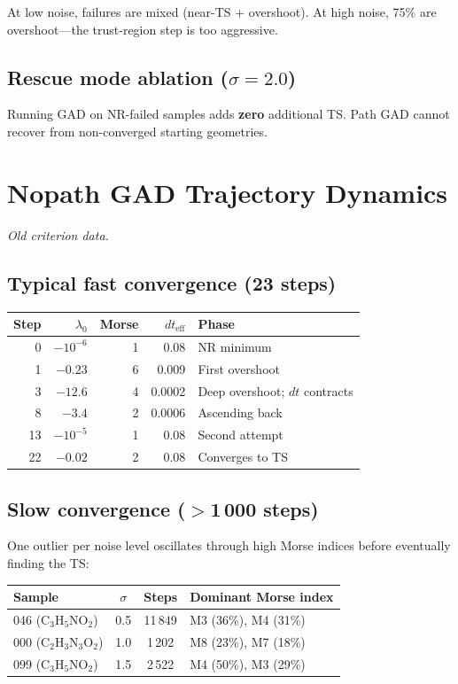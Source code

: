 \documentclass[11pt,a4paper]{article}
\newcommand{\eval}{\lambda}
\begin{document}
At low noise, failures are mixed (near-TS + overshoot).
At high noise, 75\% are overshoot---the trust-region step is too aggressive.

\subsection{Rescue mode ablation ($\sigma = 2.0$)}

Running GAD on NR-failed samples adds \textbf{zero} additional TS.
Path GAD cannot recover from non-converged starting geometries.

\section{Nopath GAD Trajectory Dynamics}
\label{app:dynamics}

\textit{Old criterion data.}

\subsection{Typical fast convergence (23 steps)}

\begin{center}\small
\begin{tabular}{rrrrl}
\toprule
Step & $\eval_0$ & Morse & $dt_\text{eff}$ & Phase \\
\midrule
0  & $-10^{-6}$ & 1 & 0.08 & NR minimum \\
1  & $-0.23$    & 6 & 0.009 & First overshoot \\
3  & $-12.6$    & 4 & 0.0002 & Deep overshoot; $dt$ contracts \\
8  & $-3.4$     & 2 & 0.0006 & Ascending back \\
13 & $-10^{-5}$ & 1 & 0.08 & Second attempt \\
22 & $-0.02$    & 2 & 0.08 & Converges to TS \\
\bottomrule
\end{tabular}
\end{center}

\subsection{Slow convergence ($>$1\,000 steps)}

One outlier per noise level oscillates through high Morse indices before
eventually finding the TS:

\begin{center}\small
\begin{tabular}{lccl}
\toprule
Sample & $\sigma$ & Steps & Dominant Morse index \\
\midrule
046 (C$_3$H$_5$NO$_2$) & 0.5 & 11\,849 & M3 (36\%), M4 (31\%) \\
000 (C$_2$H$_3$N$_3$O$_2$) & 1.0 & 1\,202 & M8 (23\%), M7 (18\%) \\
099 (C$_3$H$_5$NO$_2$) & 1.5 & 2\,522 & M4 (50\%), M3 (29\%) \\
\bottomrule
\end{tabular}
\end{center}
\end{document}
